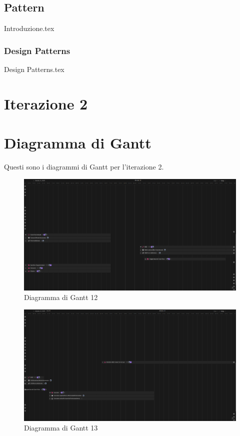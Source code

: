 \documentclass[12pt]{article}
\begin{document}
\subsection{Pattern}
{Introduzione.tex}


\subsubsection{Design Patterns}
{Design Patterns.tex}

\section*{\Huge \textbf{Iterazione 2}}
\setcounter{section}{0} 
\renewcommand{\thesubsection}{\arabic{subsection}} 

\section{Diagramma di Gantt}
Questi sono i diagrammi di Gantt per l'iterazione 2.

\begin{figure}[H]
    \includegraphics[width=\textwidth,keepaspectratio]{Immagini/Gantt/Iterazione 2/Gantt12.png}
        \caption{Diagramma di Gantt 12} 
        \label{fig:Gantt12}
\end{figure}

\begin{figure}[H]
    \includegraphics[width=\textwidth,keepaspectratio]{Immagini/Gantt/Iterazione 2/Gantt13.png}
        \caption{Diagramma di Gantt 13} 
        \label{fig:Gantt13}
\end{figure}
\end{document}
